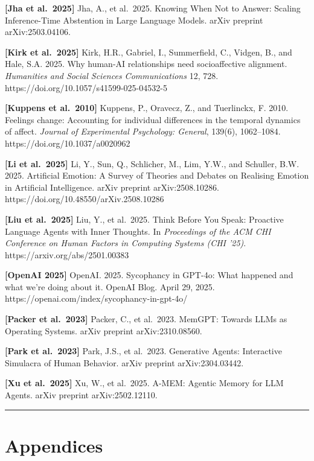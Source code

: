 \documentclass[12pt]{article}
\begin{document}
\textbf{{[}Jha et al.~2025{]}} Jha, A., et al.~2025. Knowing When Not to
Answer: Scaling Inference-Time Abstention in Large Language Models.
arXiv preprint arXiv:2503.04106.

\textbf{{[}Kirk et al.~2025{]}} Kirk, H.R., Gabriel, I., Summerfield,
C., Vidgen, B., and Hale, S.A. 2025. Why human-AI relationships need
socioaffective alignment. \emph{Humanities and Social Sciences
Communications} 12, 728. https://doi.org/10.1057/s41599-025-04532-5

\textbf{{[}Kuppens et al.~2010{]}} Kuppens, P., Oravecz, Z., and
Tuerlinckx, F. 2010. Feelings change: Accounting for individual
differences in the temporal dynamics of affect. \emph{Journal of
Experimental Psychology: General}, 139(6), 1062--1084.
https://doi.org/10.1037/a0020962

\textbf{{[}Li et al.~2025{]}} Li, Y., Sun, Q., Schlicher, M., Lim, Y.W.,
and Schuller, B.W. 2025. Artificial Emotion: A Survey of Theories and
Debates on Realising Emotion in Artificial Intelligence. arXiv preprint
arXiv:2508.10286. https://doi.org/10.48550/arXiv.2508.10286

\textbf{{[}Liu et al.~2025{]}} Liu, Y., et al.~2025. Think Before You
Speak: Proactive Language Agents with Inner Thoughts. In
\emph{Proceedings of the ACM CHI Conference on Human Factors in
Computing Systems (CHI '25)}. https://arxiv.org/abs/2501.00383

\textbf{{[}OpenAI 2025{]}} OpenAI. 2025. Sycophancy in GPT-4o: What
happened and what we're doing about it. OpenAI Blog. April 29, 2025.
https://openai.com/index/sycophancy-in-gpt-4o/

\textbf{{[}Packer et al.~2023{]}} Packer, C., et al.~2023. MemGPT:
Towards LLMs as Operating Systems. arXiv preprint arXiv:2310.08560.

\textbf{{[}Park et al.~2023{]}} Park, J.S., et al.~2023. Generative
Agents: Interactive Simulacra of Human Behavior. arXiv preprint
arXiv:2304.03442.

\textbf{{[}Xu et al.~2025{]}} Xu, W., et al.~2025. A-MEM: Agentic Memory
for LLM Agents. arXiv preprint arXiv:2502.12110.

\begin{center}\rule{0.5\linewidth}{0.5pt}\end{center}



\section*{Appendices}
\end{document}
